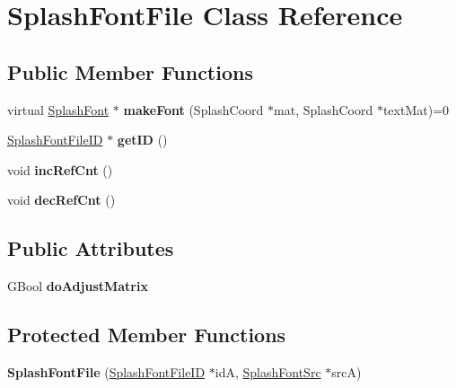 \hypertarget{class_splash_font_file}{}\section{Splash\+Font\+File Class Reference}
\label{class_splash_font_file}
\subsection*{Public Member Functions}
\begin{DoxyCompactItemize}
\item 
\mbox{\label{class_splash_font_file_a5a6360522157953b97bdaa6f42718186}} 
virtual \hyperlink{class_splash_font}{Splash\+Font} $\ast$ {\bfseries make\+Font} (Splash\+Coord $\ast$mat, Splash\+Coord $\ast$text\+Mat)=0
\item 
\mbox{\label{class_splash_font_file_a5bfe3df059a0b3b43941116f77f4dd4d}} 
\hyperlink{class_splash_font_file_i_d}{Splash\+Font\+File\+ID} $\ast$ {\bfseries get\+ID} ()
\item 
\mbox{\label{class_splash_font_file_a3900a2724efc098c03725d45057db103}} 
void {\bfseries inc\+Ref\+Cnt} ()
\item 
\mbox{\label{class_splash_font_file_a0cb54cf96f1a39b97da5a2489f249a45}} 
void {\bfseries dec\+Ref\+Cnt} ()
\end{DoxyCompactItemize}
\subsection*{Public Attributes}
\begin{DoxyCompactItemize}
\item 
\mbox{\label{class_splash_font_file_a9aa2a895453ecc8f0c5605f34c4eee79}} 
G\+Bool {\bfseries do\+Adjust\+Matrix}
\end{DoxyCompactItemize}
\subsection*{Protected Member Functions}
\begin{DoxyCompactItemize}
\item 
\mbox{\label{class_splash_font_file_a7f5988c9d30c33c32b36554b897b2f09}} 
{\bfseries Splash\+Font\+File} (\hyperlink{class_splash_font_file_i_d}{Splash\+Font\+File\+ID} $\ast$idA, \hyperlink{class_splash_font_src}{Splash\+Font\+Src} $\ast$srcA)
\end{DoxyCompactItemize}
